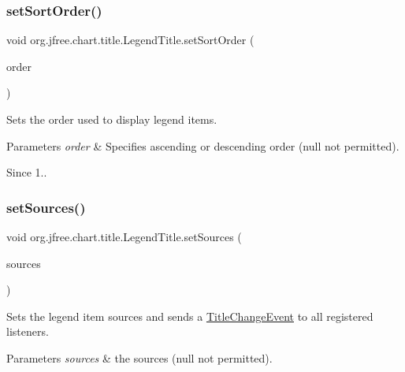 \subsubsection{\texorpdfstring{set\+Sort\+Order()}{setSortOrder()}}
{\footnotesize\ttfamily void org.\+jfree.\+chart.\+title.\+Legend\+Title.\+set\+Sort\+Order (\begin{DoxyParamCaption}\item[{Sort\+Order}]{order }\end{DoxyParamCaption})}

Sets the order used to display legend items.


\begin{DoxyParams}{Parameters}
{\em order} & Specifies ascending or descending order ({\ttfamily null} not permitted). \\
\hline
\end{DoxyParams}
\begin{DoxySince}{Since}
1.. 
\end{DoxySince}
\mbox{\label{classorg_1_1jfree_1_1chart_1_1title_1_1_legend_title_a72eff4f5d39baf4619009ce06bfaa860}} 
\subsubsection{\texorpdfstring{set\+Sources()}{setSources()}}
{\footnotesize\ttfamily void org.\+jfree.\+chart.\+title.\+Legend\+Title.\+set\+Sources (\begin{DoxyParamCaption}\item[{\mbox{\hyperlink{interfaceorg_1_1jfree_1_1chart_1_1_legend_item_source}{Legend\+Item\+Source}} \mbox{[}$\,$\mbox{]}}]{sources }\end{DoxyParamCaption})}

Sets the legend item sources and sends a \mbox{\hyperlink{}{Title\+Change\+Event}} to all registered listeners.


\begin{DoxyParams}{Parameters}
{\em sources} & the sources ({\ttfamily null} not permitted). \\
\hline
\end{DoxyParams}
\mbox{\label{classorg_1_1jfree_1_1chart_1_1title_1_1_legend_title_a3608509ef0d36246385350e3b1587034}} 
